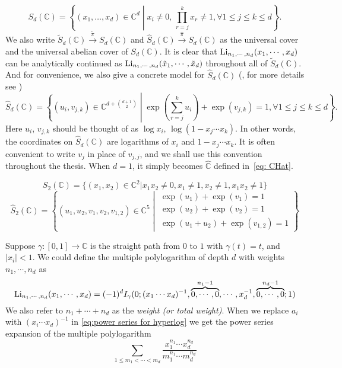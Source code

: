 \begin{definition}
\begin{equation}\label{eq: Sd}
S_d(\mathbb C)=\left\{(x_1,\dots,x_d)\in\mathbb C^d\middle| x_i\neq 0,\,\prod_{r=j}^kx_r\neq 1, \forall 1\leq j\leq k\leq d\right\}.
\end{equation}
We also write $\widetilde S_d(\mathbb C)\xrightarrow{\widetilde\pi}S_d(\mathbb C)$ and $\widehat S_d(\mathbb C)\xrightarrow{\widehat\pi}S_d(\mathbb C)$ as the universal cover and the universal abelian cover of $S_d(\mathbb C)$. It is clear that $\operatorname{Li}_{n_1,\cdots,n_d}(x_1,\cdots,x_d)$ can be analytically continued as $\operatorname{Li}_{n_1,\cdots,n_d}(\tilde x_1,\cdots,\tilde x_d)$ throughout all of $\widetilde S_d(\mathbb C)$. And for convenience, we also give a concrete model for $\widehat S_d(\mathbb C)$ (\cite{ZDHZ_HopfAlgebrasOfMultiplePolylogarithmsAndHolomorphicOneForms}, for more details see \cite{ZackThesis})
\begin{equation}\label{eq: SdHat}
\widehat S_d(\mathbb C)=\left\{(u_i,v_{j,k})\in \mathbb C^{d+\binom{d+1}{2}}\middle|\exp\left(\sum_{r=j}^k u_i\right)+\exp(v_{j,k})=1,\forall 1\leq j\leq k\leq d\right\}.
\end{equation}
Here $u_i$, $v_{j,k}$ should be thought of as $\log x_i$, $\log(1-x_j\cdots x_k)$. In other words, the coordinates on $\widehat S_d(\mathbb C)$ are logarithms of $x_i$ and $1-x_j\cdots x_k$. It is often convenient to write $v_j$ in place of $v_{j,j}$, and we shall use this convention throughout the thesis. When $d=1$, it simply becomes $\widehat{\mathbb C}$ defined in~\eqref{eq: CHat}.
\end{definition}

\begin{example}
\[
S_2(\mathbb C)=\{(x_1,x_2)\in\mathbb C^2|x_1x_2\neq 0,x_1\neq 1,x_2\neq1,x_1x_2\neq 1\}
\]
\[
\widehat S_2(\mathbb C)=\left\{(u_1,u_2,v_1,v_2,v_{1,2})\in\mathbb C^5\middle|\substack{\exp(u_1)+\exp(v_1)=1\\
\exp(u_2)+\exp(v_2)=1\\
\exp(u_1+u_2)+\exp(v_{1,2})=1}\right\}
\]
\end{example}

\begin{definition}
Suppose $\gamma:[0,1]\to\mathbb C$ is the straight path from $0$ to $1$ with $\gamma(t)=t$, and $|x_i|<1$. We could define the multiple polylogarithm of depth $d$ with weights $n_1,\cdots,n_d$ as
\begin{equation}\label{eq: Li as iterated integrals}
\operatorname{Li}_{n_1,\cdots,n_d}(x_1,\cdots,x_d)=(-1)^dI_\gamma(0;(x_1\cdots x_d)^{-1},\overbrace{0,\cdots,0}^{n_1-1},\cdots,x_d^{-1},\overbrace{0,\cdots,0}^{n_d-1};1)
\end{equation}
We also refer to $n_1+\cdots+n_d$ as the \textit{weight (or total weight)}. When we replace $a_i$ with $(x_i\cdots x_d)^{-1}$ in \eqref{eq:power series for hyperlog} we get the power series expansion of the multiple polylogarithm
\begin{equation}
\sum_{1\leq m_1<\cdots<m_d}\frac{x_1^{n_1}\cdots x_d^{n_d}}{m_1^{n_1}\cdots m_d^{n_d}}
\end{equation}
\end{definition}

